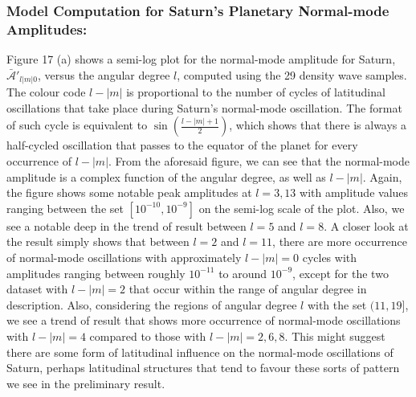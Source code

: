 \documentclass{article}
\begin{document}
\subsubsection{Model Computation for Saturn's Planetary Normal-mode Amplitudes:}
Figure 17 (a) shows a semi-log plot for the normal-mode amplitude for Saturn, $\mathscr{\bar{A}'}_{l|m|0}$, versus the angular degree $l$, computed using the 29 density wave samples. The colour code $l-|m|$ is proportional to the number of cycles of latitudinal oscillations that take place during Saturn's normal-mode oscillation. The format of such cycle is equivalent to $\sin(\frac{l-|m|+1}{2})$, which shows that there is always a half-cycled oscillation that passes to the equator of the planet for every occurrence of $l-|m|$. From the aforesaid figure, we can see that the normal-mode amplitude is a complex function of the angular degree, as well as $l-|m|$. Again, the figure shows some notable peak amplitudes at $l = 3, 13$ with amplitude values ranging between the set $[10^{-10}, 10^{-9}]$ on the semi-log scale of the plot. Also, we see a notable deep in the trend of result between $l=5$ and $l=8$. A closer look at the result simply shows that between $l=2$ and $l=11$, there are more occurrence of normal-mode oscillations with approximately $l-|m|=0$ cycles with amplitudes ranging between roughly $10^{-11}$ to around $10^{-9}$, except for the two dataset with $l-|m|=2$ that occur within the range of angular degree in description. Also, considering the regions of angular degree $l$ with the set $(11,19]$, we see a trend of result that shows more occurrence of normal-mode oscillations with $l-|m|=4$ compared to those with $l-|m|=2,6,8$. This might suggest there are some form of latitudinal influence on the normal-mode oscillations of Saturn, perhaps latitudinal structures that tend to favour these sorts of pattern we see in the preliminary result. 
\end{document}
